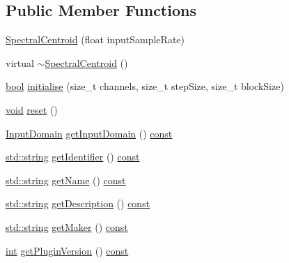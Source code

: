 \subsection*{Public Member Functions}
\begin{DoxyCompactItemize}
\item 
\hyperlink{class_spectral_centroid_a2cd801ad72f262eceb95ab0d22e7dbcd}{Spectral\+Centroid} (float input\+Sample\+Rate)
\item 
virtual \hyperlink{class_spectral_centroid_a483e0d6757bc3dcf61e8066f764f45c6}{$\sim$\+Spectral\+Centroid} ()
\item 
\hyperlink{mac_2config_2i386_2lib-src_2libsoxr_2soxr-config_8h_abb452686968e48b67397da5f97445f5b}{bool} \hyperlink{class_spectral_centroid_aab1ae16f5c68e2b319668f447908cedb}{initialise} (size\+\_\+t channels, size\+\_\+t step\+Size, size\+\_\+t block\+Size)
\item 
\hyperlink{sound_8c_ae35f5844602719cf66324f4de2a658b3}{void} \hyperlink{class_spectral_centroid_a9b5f5581691ff8f46bb7674d8d74395c}{reset} ()
\item 
\hyperlink{class_vamp_1_1_plugin_a39cb7649d6dcc20e4cb1640cd55907bc}{Input\+Domain} \hyperlink{class_spectral_centroid_a0ec2cb74c1c5f6e57d0bd9dcf7c8f469}{get\+Input\+Domain} () \hyperlink{getopt1_8c_a2c212835823e3c54a8ab6d95c652660e}{const} 
\item 
\hyperlink{test__lib_f_l_a_c_2format_8c_ab02026ad0de9fb6c1b4233deb0a00c75}{std\+::string} \hyperlink{class_spectral_centroid_a1b2c4c8440c024c4c635fcef5697949f}{get\+Identifier} () \hyperlink{getopt1_8c_a2c212835823e3c54a8ab6d95c652660e}{const} 
\item 
\hyperlink{test__lib_f_l_a_c_2format_8c_ab02026ad0de9fb6c1b4233deb0a00c75}{std\+::string} \hyperlink{class_spectral_centroid_ab7e6a620fea568af431be3cfd9dd5a41}{get\+Name} () \hyperlink{getopt1_8c_a2c212835823e3c54a8ab6d95c652660e}{const} 
\item 
\hyperlink{test__lib_f_l_a_c_2format_8c_ab02026ad0de9fb6c1b4233deb0a00c75}{std\+::string} \hyperlink{class_spectral_centroid_a8fbb74a46283057d9a0b0e4718ee943c}{get\+Description} () \hyperlink{getopt1_8c_a2c212835823e3c54a8ab6d95c652660e}{const} 
\item 
\hyperlink{test__lib_f_l_a_c_2format_8c_ab02026ad0de9fb6c1b4233deb0a00c75}{std\+::string} \hyperlink{class_spectral_centroid_ac01ff858bf67e2e93ad5d24a6ba8c8c8}{get\+Maker} () \hyperlink{getopt1_8c_a2c212835823e3c54a8ab6d95c652660e}{const} 
\item 
\hyperlink{xmltok_8h_a5a0d4a5641ce434f1d23533f2b2e6653}{int} \hyperlink{class_spectral_centroid_af64622e66bf678ac2b0b58aa832ca2b3}{get\+Plugin\+Version} () \hyperlink{getopt1_8c_a2c212835823e3c54a8ab6d95c652660e}{const} 

\end{DoxyCompactItemize}
